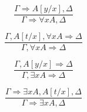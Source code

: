 \begin{definition}
\begin{multicols}{2}
\[
\frac{\Gamma \Rightarrow A[y/x], \Delta}{\Gamma \Rightarrow \forall x A, \Delta}\tag{$R\forall$}
\]

\[
\frac{\Gamma, A[t/x], \forall x A \Rightarrow \Delta}{\Gamma, \forall x A \Rightarrow \Delta}\tag{$L\forall$}
\]

\[
\frac{\Gamma, A[y/x] \Rightarrow \Delta}{\Gamma, \exists x A \Rightarrow \Delta}\tag{$L\exists$}
\]

\[
\frac{\Gamma \Rightarrow \exists x A, A[t/x], \Delta}{\Gamma \Rightarrow \exists x A, \Delta}\tag{$R\exists$}
\]

\end{multicols}

\end{definition}
